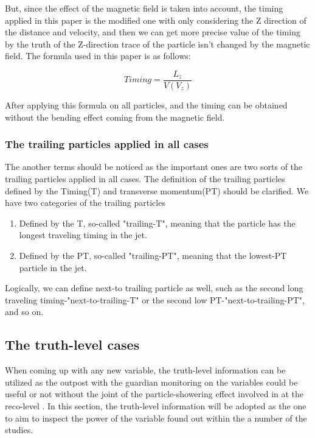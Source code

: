 But, since the effect of the magnetic field is taken into account, the timing applied in this paper is the modified one with only considering the Z direction of the distance and velocity, and then we can get more precise value of the timing by the truth of the Z-direction trace of the particle isn't changed by the magnetic field. The formula used in this paper is as follows: 

\begin{equation}
 Timing = \frac{L_{z}}{V(V_{z})} 
\end{equation}

After applying this formula on all particles, and the timing can be obtained without the bending effect coming from the magnetic field.\\ 
\subsubsection{The trailing particles applied in all cases}
The another terms should be noticed as the important ones are two sorts of the trailing particles applied in all cases. The definition of the trailing particles defined by the Timing(T) and transverse momentum(PT) should be clarified. We have two categories of the trailing particles
\begin{enumerate}
\item Defined by the T, so-called "trailing-T", meaning that the particle has the longest traveling timing in the jet. 
\item Defined by the PT, so-called "trailing-PT", meaning that the lowest-PT particle in the jet. 
\end{enumerate}

Logically, we can define next-to trailing particle as well, such as the second long traveling timing-"next-to-trailing-T" or the second low PT-"next-to-trailing-PT", and so on.

\subsection{The truth-level cases}
When coming up with any new variable, the truth-level information can be utilized as the outpost with the guardian monitoring on the variables could be useful or not without the joint of the particle-showering effect involved in at the reco-level . In this section, the truth-level information will be adopted as the one to aim to inspect the power of the variable found out within the a number of the studies.\\

